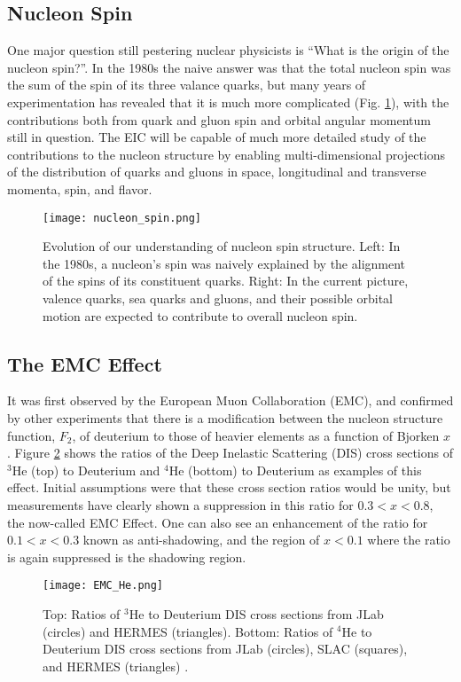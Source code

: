 \subsection{Nucleon Spin}
One major question still pestering nuclear physicists is ``What is the origin of the nucleon spin?''. In the 1980s the naive answer was that the total nucleon spin was the sum of the spin of its three valance quarks, but many years of experimentation has revealed that it is much more complicated (Fig. \ref{fig:nucleon_spin}), with the contributions both from quark and gluon spin and orbital angular momentum still in question. The EIC will be capable of much more detailed study of the contributions to the nucleon structure by enabling multi-dimensional projections of the distribution of quarks and gluons in space, longitudinal and transverse momenta, spin, and flavor.

\begin{figure}[!htb]
	\centering
	\texttt{[image: nucleon\_spin.png]}
	\caption{Evolution of our understanding of nucleon spin structure. Left: In the 1980s, a nucleon’s spin was naively explained by the alignment of the spins of its constituent quarks. Right: In the current picture, valence quarks, sea quarks and gluons, and their possible orbital motion are expected to contribute to overall nucleon spin. \cite{EICWhitePaper}}
	\label{fig:nucleon_spin}
\end{figure}

\subsection{The EMC Effect}
It was first observed by the European Muon Collaboration (EMC), and confirmed by other experiments that there is a modification between the nucleon structure function, $F_2$, of deuterium to those of heavier elements as a function of Bjorken $x$ \cite{SRC_EMC_effect}. Figure \ref{fig:emc_effect} shows the ratios of the Deep Inelastic Scattering (DIS) cross sections of ${}^3$He (top) to Deuterium and ${}^4$He (bottom) to Deuterium as examples of this effect. Initial assumptions were that these cross section ratios would be unity, but measurements have clearly shown a suppression in this ratio for $0.3 < x < 0.8$, the now-called EMC Effect. One can also see an enhancement of the ratio for $0.1 < x < 0.3$ known as anti-shadowing, and the region of $x < 0.1$ where the ratio is again suppressed is the shadowing region.

\begin{figure}[!htb]
	\centering
	\texttt{[image: EMC\_He.png]}
	\caption{Top: Ratios of ${}^3$He to Deuterium DIS cross sections from JLab (circles) and HERMES (triangles). Bottom: Ratios of ${}^4$He to Deuterium DIS cross sections from JLab (circles), SLAC (squares), and HERMES (triangles) \cite{EMC_Challenge}.}
	\label{fig:emc_effect}
\end{figure}


